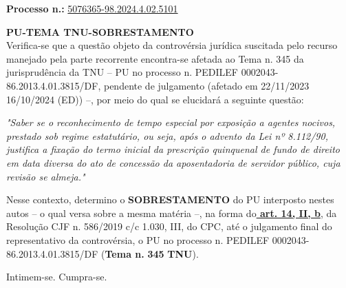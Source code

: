 \documentclass[12pt]{article}
\begin{document}
\justifying
\noindent \textbf{Processo n.: }\uline{5076365-98.2024.4.02.5101}

{\Large\bfseries \textbf{PU-TEMA TNU-SOBRESTAMENTO}}\\

\noindent Verifica-se que a questão objeto da controvérsia jurídica suscitada pelo recurso manejado pela parte recorrente encontra-se afetada ao Tema n. 345 da jurisprudência da TNU – PU no processo n. PEDILEF 0002043-86.2013.4.01.3815/DF, pendente de julgamento (afetado em 22/11/2023 16/10/2024 (ED)) –, por meio do qual se elucidará a seguinte questão:

\noindent \textit{"Saber se o reconhecimento de tempo especial por exposição a agentes nocivos, prestado sob regime estatutário, ou seja, após o advento da Lei nº 8.112/90, justifica a fixação do termo inicial da prescrição quinquenal de fundo de direito em data diversa do ato de concessão da aposentadoria de servidor público, cuja revisão se almeja."}

\noindent Nesse contexto, determino o \textbf{SOBRESTAMENTO} do PU interposto nestes autos – o qual versa sobre a mesma matéria –, na forma do\textbf{\uline{ art. 14, II, b}}, da Resolução CJF n. 586/2019 c/c 1.030, III, do CPC, até o julgamento final do representativo da controvérsia, o PU no processo n. PEDILEF 0002043-86.2013.4.01.3815/DF (\textbf{Tema n. }\textbf{345 }\textbf{TNU}).

\noindent Intimem-se. Cumpra-se.
\end{document}
